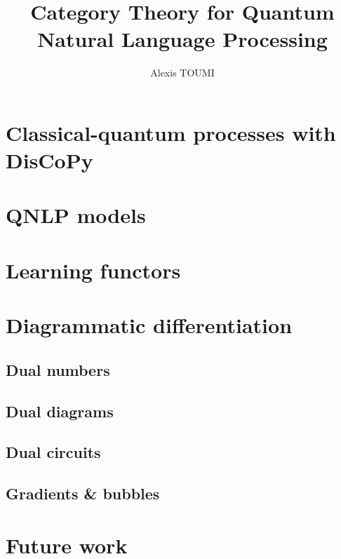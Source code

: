 \documentclass[a4paper,twoside]{ociamthesis}
\title{Category Theory for Quantum\\Natural Language Processing}
\author{Alexis TOUMI} \college{Wolfson College} \degree{Doctor of Philosophy}
\begin{document}
\maketitle

\tableofcontents


























\section{Classical-quantum processes with DisCoPy}
\section{QNLP models}
\section{Learning functors}

\section{Diagrammatic differentiation} \label{chapter-3:diag-diff}
\subsection{Dual numbers}
\subsection{Dual diagrams}
\subsection{Dual circuits}
\subsection{Gradients \& bubbles}

\section{Future work}

\renewcommand*\MakeUppercase[1]{#1}%
\setlength{\baselineskip}{0pt} %
\printbibliography[heading=bibintoc,title=References]
\end{document}
